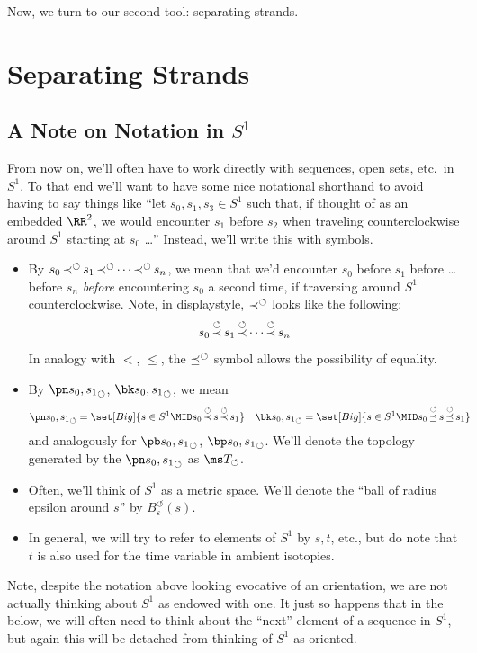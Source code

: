 Now, we turn to our second tool: separating strands.

\section{Separating Strands}\label{sec:separating-strands}

\subsection{A Note on Notation in $S^1$}\label{sec:s1-notation}
From now on, we'll often have to work directly with sequences, open
sets, etc.\ in $S^1$. To that end we'll want to have some nice
notational shorthand to avoid having to say things like ``let $s_0,
s_1, s_3\in S^1$ such that, if thought of as an embedded $\RR^2$, we
would encounter $s_1$ before $s_2$ when traveling counterclockwise
around $S^1$ starting at $s_0$ \ldots'' Instead, we'll write this with
symbols.
\begin{itemize}
  \item By $s_0 \operatorname{\operatorname*{\prec}^{\circlearrowleft}} s_1 \operatorname{\operatorname*{\prec}^{\circlearrowleft}} \cdots \operatorname{\operatorname*{\prec}^{\circlearrowleft}} s_n$, we mean that
    we'd encounter $s_0$ before $s_1$ before \ldots before $s_n$
    \emph{before} encountering $s_0$ a second time, if traversing
    around $S^1$ counterclockwise. Note, in displaystyle, $\operatorname{\operatorname*{\prec}^{\circlearrowleft}}$
    looks like the following:
    \[
    s_0 \operatorname{\operatorname*{\prec}^{\circlearrowleft}} s_1 \operatorname{\operatorname*{\prec}^{\circlearrowleft}} \cdots \operatorname{\operatorname*{\prec}^{\circlearrowleft}} s_n
    \]
    In analogy with $<$, $\leq$, the $\operatorname{\operatorname*{\preceq}^{\circlearrowleft}}$ symbol allows the
    possibility of equality.
  \item By $\spn{s_0, s_1}$, $\sbk{s_0, s_1}$, we mean
    {\small
    \begin{align*}
      \spn{s_0, s_1} &= \set[Big]{s \in S^1 \MID s_0 \sprec s \sprec s_1}
      &
        \sbk{s_0, s_1} &= \set[Big]{s \in S^1 \MID s_0 \spreceq s \spreceq s_1}
    \end{align*}}
    and analogously for $\spb{s_0, s_1}$, $\sbp{s_0, s_1}$. We'll
    denote the topology generated by the $\spn{s_0, s_1}$ as $\tcirc$.
  \item Often, we'll think of $S^1$ as a metric space. We'll denote
    the ``ball of radius epsilon around $s$'' by
    $B_{\varepsilon}^\circlearrowleft(s)$.
  \item In general, we will try to refer to elements of $S^1$ by
    $s,t$, etc., but do note that $t$ is also used for the time
    variable in ambient isotopies.
\end{itemize}
Note, despite the notation above looking evocative of an orientation,
we are not actually thinking about $S^1$ as endowed with one. It just
so happens that in the below, we will often need to think about the
``next'' element of a sequence in $S^1$, but again this will be
detached from thinking of $S^1$ as oriented.









